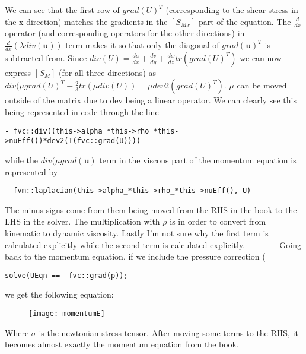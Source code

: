 We can see that the first row of $grad(U)^T$ (corresponding to the shear stress in the x-direction) matches the gradients in the $[S_{Mx}]$ part of the equation.
\vspace{\baselineskip}
The $\frac{d}{dx}$ operator (and corresponding operators for the other directions) in $\frac{d}{dx}(\lambda div(\textbf{u}))$ term makes it so that only the diagonal of $grad(\textbf{u})^T$ is subtracted from.
\vspace{\baselineskip}
Since $div(U)=\frac{du}{dx} + \frac{dv}{dy} + \frac{dw}{dz} tr(grad(U)^T)$ we can now express $[S_{M}]$ (for all three directions) as $div(\mu grad(U)^T - \frac{2}{3} tr( \mu div(U)) = \mu dev2( grad(U)^T)$. $\mu$ can be moved outside of the matrix due to dev being a linear operator.
\vspace{\baselineskip}
We can clearly see this being represented in code through the line
\begin{verbatim}
- fvc::div((this->alpha_*this->rho_*this->nuEff())*dev2(T(fvc::grad(U))))
\end{verbatim}
while the $div(\mu grad(\textbf{u})$ term in the viscous part of the momentum equation is represented by
\begin{verbatim}
- fvm::laplacian(this->alpha_*this->rho_*this->nuEff(), U)
\end{verbatim}
The minus signs come from them being moved from the RHS in the book to the LHS in the solver.
\vspace{\baselineskip}
The multiplication with $\rho$ is in order to convert from kinematic to dynamic viscosity.
\vspace{\baselineskip}
Lastly I'm not sure why the first term is calculated explicitly while the second term is calculated explicitly.
\vspace{\baselineskip}
-----------
\vspace{\baselineskip}
Going back to the momentum equation, if we include the pressure correction (\begin{verbatim}solve(UEqn == -fvc::grad(p)); \end{verbatim} we get the following equation:

\begin{figure}[H]
\centering
\texttt{[image: momentumE]}
\end{figure}

Where $\sigma$ is the newtonian stress tensor.
\vspace{\baselineskip}
After moving some terms to the RHS, it becomes almost exactly the momentum equation from the book.

